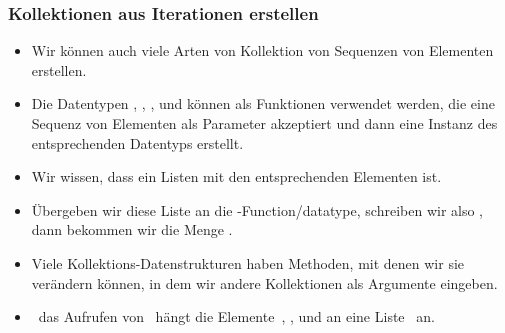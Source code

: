 \documentclass[aspectratio=169,mathserif,notheorems]{beamer}%
\begin{document}
\begin{frame}%
\frametitle{Kollektionen aus Iterationen erstellen}%
\begin{itemize}%
%
\item Wir können auch viele Arten von Kollektion von Sequenzen von Elementen erstellen.%
%
\item<2-> Die Datentypen  , , , und  können als Funktionen verwendet werden, die eine Sequenz von Elementen als Parameter akzeptiert und dann eine Instanz des entsprechenden Datentyps erstellt.%
%
\item<3-> Wir wissen, dass \pythonil{[1, 2, 2, 3]} ein Listen mit den entsprechenden Elementen ist.%
%
\item<4-> Übergeben wir diese Liste an die -Function/datatype, schreiben wir also , dann bekommen wir die Menge .%
%
\item<5-> Viele Kollektions-Datenstrukturen haben Methoden, mit denen wir sie verändern können, in dem wir andere Kollektionen als Argumente eingeben.%
%
\item<6-> \DEZB\ das Aufrufen von~ hängt die Elemente~, , und  an eine Liste~ an.%
%
\end{itemize}%
\end{frame}%
%
\end{document}
